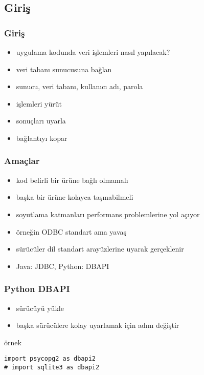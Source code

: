 \documentclass[dvipsnames]{beamer}
\theoremstyle{plain}
\begin{document}
\subsection{Giriş}

\begin{frame}
  \frametitle{Giriş}

  \begin{itemize}
    \item uygulama kodunda veri işlemleri nasıl yapılacak?

    \bigskip
    \item veri tabanı sunucusuna bağlan
    \item sunucu, veri tabanı, kullanıcı adı, parola

    \medskip
    \item işlemleri yürüt
    \item sonuçları uyarla

    \medskip
    \item bağlantıyı kopar
  \end{itemize}
\end{frame}

\begin{frame}
  \frametitle{Amaçlar}

  \begin{itemize}
    \item kod belirli bir ürüne bağlı olmamalı
    \item başka bir ürüne kolayca taşınabilmeli

    \medskip
    \item soyutlama katmanları performans problemlerine yol açıyor
    \item örneğin ODBC standart ama yavaş

    \pause
    \bigskip
    \item sürücüler dil standart arayüzlerine uyarak gerçeklenir
    \item Java: JDBC, Python: DBAPI
  \end{itemize}
\end{frame}

\begin{frame}[fragile]
  \frametitle{Python DBAPI}

  \begin{itemize}
    \item sürücüyü yükle
    \item başka sürücülere kolay uyarlamak için adını değiştir
  \end{itemize}

  \begin{exampleblock}{örnek}
    \begin{lstlisting}
import psycopg2 as dbapi2
# import sqlite3 as dbapi2
    \end{lstlisting}
  \end{exampleblock}
\end{frame}
\end{document}

